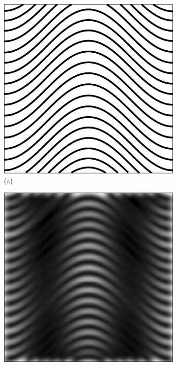 \begin{figure}[t]
    \centering
    \begin{subfigure}{.29\textwidth}
        \centering
        \includegraphics[scale=.08]{figures/WavesStreamlines.png}
        \caption*{(a)}
    \end{subfigure}
    \begin{subfigure}{.29\textwidth}
        \centering
        \includegraphics[scale=.08]{figures/WavesStreamlinesBlur.png}

\end{subfigure}
\end{figure}
